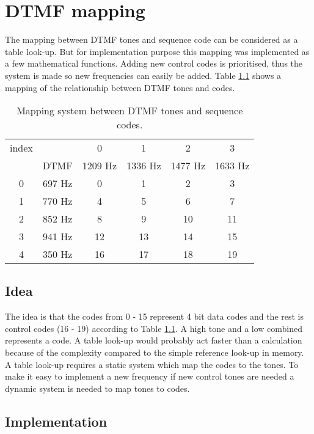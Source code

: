 \chapter{DTMF mapping}\label{app:physical_encode}
The mapping between DTMF tones and sequence code can be considered as a table look-up. But for implementation purpose this mapping was implemented as a few mathematical functions. 
 Adding new control codes is prioritised, thus the system is made so new frequencies can easily be added.
Table \ref{app_dtmf:DTMF_mapping_table} shows a mapping of the relationship between DTMF tones and codes. 

\begin{table}[htb]
	\begin{center}
		\begin{tabular}{c c|c c c c}
 		index & & 0 & 1 & 2 & 3 \\
		& DTMF & 1209 Hz & 1336 Hz & 1477 Hz & 1633 Hz \\
		\hline
		0 & 697 Hz & 0 & 1 & 2 & 3 \\
		1 & 770 Hz & 4 & 5 & 6 & 7 \\
		2 & 852 Hz & 8 & 9 & 10 & 11 \\
		3 & 941 Hz & 12 & 13 & 14 & 15 \\
		4 & 350 Hz & 16 & 17 & 18 & 19 \\
		\end{tabular}
	\end{center}
	\caption{Mapping system between DTMF tones and sequence codes.}
	\label{app_dtmf:DTMF_mapping_table}
\end{table}

	\section{Idea}
	The idea is that the codes from 0 - 15 represent 4 bit data codes and the rest is control codes (16 - 19) according to Table \ref{app_dtmf:DTMF_mapping_table}. A high tone and a low combined represents a code. A table look-up would probably act faster than a calculation because of the complexity compared to the simple reference look-up in memory. A table look-up requires a static system which map the codes to the tones. To make it easy to implement a new frequency if new control tones are needed a dynamic system is needed to map tones to codes.
	
	\section{Implementation}


